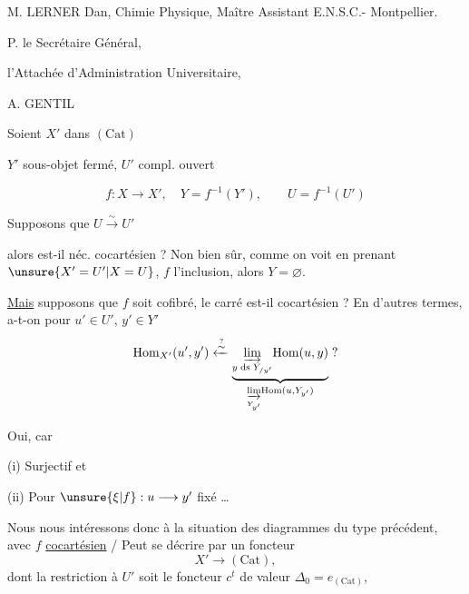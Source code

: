 M. LERNER Dan, Chimie Physique, Maître Assistant E.N.S.C.- Montpellier.

P. le Secrétaire Général,

l'Attachée d'Administration Universitaire,


A. GENTIL



Soient $X'$ dans $(\mathrm{Cat})$

$Y'$ sous-objet fermé, $U'$ compl. ouvert


\[
f:X\longrightarrow X',\quad Y=f^{-1}(Y'),\qquad U=f^{-1}(U')
\]

Supposons que $U\xrightarrow{\sim}U'$

alors  est-il néc. cocartésien ? Non bien sûr, comme on voit en prenant $\unsure{X'=U'|X=U}$, $f$ l'inclusion, alors $Y=\varnothing$.

\uline{Mais} supposons que $f$ soit cofibré, le carré est-il cocartésien ? En d'autres termes, a-t-on pour $u'\in U'$, $y'\in Y'$
\[
\mathrm{Hom}_{X'}(u',y')\xleftarrow{\overset{?}{\sim}}
\underbrace{\underset{y\;\mathrm{ds}\;Y_{/y'}}{\varinjlim}\mathrm{Hom}(u,y)}_{\underset{Y_{y'}}{\varinjlim}\mathrm{Hom}(u,Y_{y'})}\;?
\]


Oui, car 

(i) Surjectif et

(ii) Pour $\unsure{\xi|f}:u\longrightarrow y'$ fixé \ldots

Nous nous intéressons donc à la situation des diagrammes du type précédent, avec $f$ \uline{cocartésien} / Peut se décrire par un foncteur
\[
X'\longrightarrow(\mathrm{Cat}),
\]
 dont la restriction à $U'$ soit le foncteur $c^t$ de valeur $\Delta_0=e_{(\mathrm{Cat})}$,

